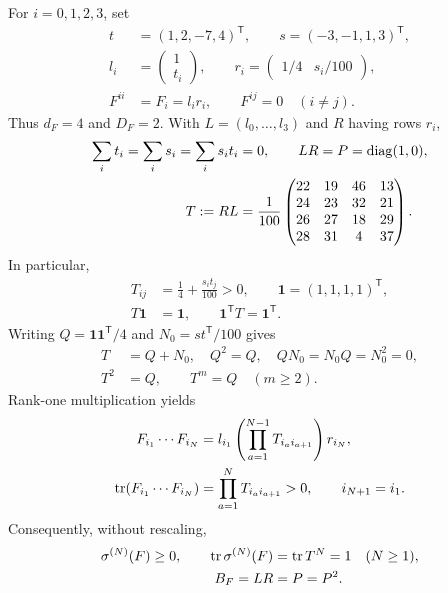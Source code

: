 \documentclass[aps,pra,reprint,nofootinbib,onecolumn]{revtex4-2}
\begin{document}
For $i=0,1,2,3$, set
\begin{align}
	t      & =(1,2,-7,4)^{\mathsf T},\qquad
	s=(-3,-1,1,3)^{\mathsf T},\nonumber                   \\
	l_i    & =\begin{pmatrix}1\\ t_i\end{pmatrix},\qquad
	r_i=\begin{pmatrix}1/4&s_i/100\end{pmatrix},\nonumber \\
	F^{ii} & =F_i=l_ir_i,\qquad F^{ij}=0\quad(i\ne j).
	\label{eq:slices}
\end{align}
Thus $d_F=4$ and $D_F=2$. With $L=(l_0,\ldots,l_3)$ and
$R$ having rows $r_i$,
\begin{align}
	\sum_it_i=\sum_is_i=\sum_is_it_i & =0,\qquad
	LR=P=\operatorname{diag}(1,0),\label{eq:LR}                   \\
	T:=RL                            & =\frac1{100}
	\begin{pmatrix}
		22 & 19 & 46 & 13 \\
		24 & 23 & 32 & 21 \\
		26 & 27 & 18 & 29 \\
		28 & 31 & 4  & 37
	\end{pmatrix}.
	\label{eq:T}
\end{align}
In particular,
\begin{align}
	T_{ij}        & =\frac14+\frac{s_it_j}{100}>0,\qquad
	\boldsymbol1=(1,1,1,1)^{\mathsf T},\nonumber         \\
	T\boldsymbol1 & =\boldsymbol1,\qquad
	\boldsymbol1^{\mathsf T}T=\boldsymbol1^{\mathsf T}.
	\label{eq:T-stochastic}
\end{align}
Writing $Q=\boldsymbol1\boldsymbol1^{\mathsf T}/4$ and
$N_0=st^{\mathsf T}/100$ gives
\begin{align}
	T   & =Q+N_0,\quad Q^2=Q,\quad QN_0=N_0Q=N_0^2=0,\nonumber \\
	T^2 & =Q,\qquad T^m=Q\quad(m\geq2).
	\label{eq:Tpowers}
\end{align}
Rank-one multiplication yields
\begin{align}
	F_{i_1}\cdots F_{i_N}
	 & =l_{i_1}\left(\prod_{a=1}^{N-1}T_{i_ai_{a+1}}\right)r_{i_N},
	\label{eq:rankone}                                              \\
	\operatorname{tr}(F_{i_1}\cdots F_{i_N})
	 & =\prod_{a=1}^NT_{i_ai_{a+1}}>0,\qquad i_{N+1}=i_1.\nonumber
\end{align}
Consequently, without rescaling,
\begin{align}
	\sigma^{(N)}(F)\geq0,\qquad
	\operatorname{tr}\sigma^{(N)}(F) & =\operatorname{tr} T^N=1\quad(N\geq1),\nonumber \\
	B_F=LR             & =P=P^2.
	\label{eq:F-state}
\end{align}
\end{document}
